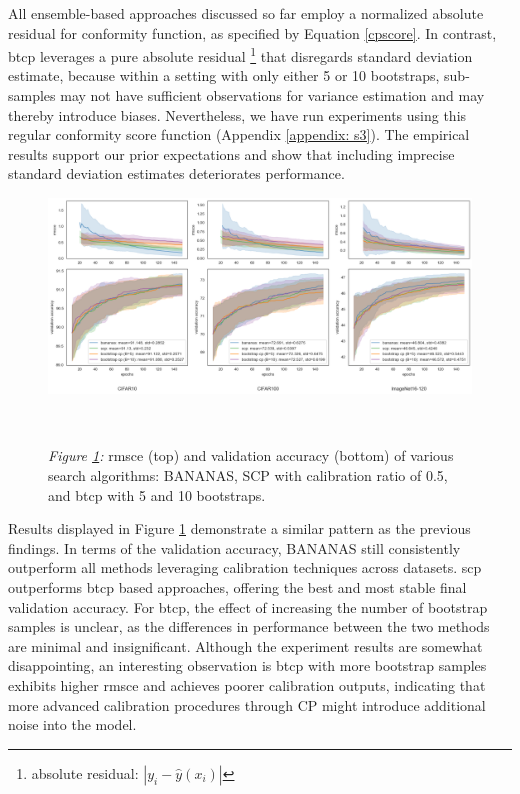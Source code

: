 \documentclass[a4paper,oneside,bibliography=totoc]{scrbook}
\begin{document}
\begin{description}[leftmargin=0cm, listparindent=\parindent]
		All ensemble-based approaches discussed so far employ a normalized absolute residual for conformity function, as specified by Equation \ref{cpscore}. In contrast, \gls{btcp} leverages a pure absolute residual \footnote{absolute residual: $|y_i - \hat{y}(x_i)|$} that disregards standard deviation estimate, because within a setting with only either 5 or 10 bootstraps, sub-samples may not have sufficient observations for variance estimation and may thereby introduce biases. Nevertheless, we have run experiments using this regular conformity score function (Appendix \ref{appendix: s3}). The empirical results support our prior expectations and show that including imprecise standard deviation estimates deteriorates performance.
	
	\vspace{0.3em}
	\begin{figure}[H]
		\centering
		\includegraphics[scale=0.37 ]{figs/bootstrap.png}
		\label{fig: btcp}
		\\
 		\parbox{\linewidth}{
		\vspace{1em}
 	  		{\small \textit{Figure \ref{fig: btcp}:} \gls{rmsce} (top) and validation accuracy (bottom) of various search algorithms: BANANAS, SCP with calibration ratio of 0.5, and \gls{btcp} with 5 and 10 bootstraps.}
 	 	}	
	\end{figure}	 
	
	\vspace{1em}
	Results displayed in Figure \ref{fig: btcp} demonstrate a similar pattern as the previous findings. In terms of the validation accuracy, BANANAS still consistently outperform all methods leveraging calibration techniques across datasets. \gls{scp} outperforms \gls{btcp} based approaches, offering the best and most stable final validation accuracy. For \gls{btcp}, the effect of increasing the number of bootstrap samples is unclear, as the differences in performance between the two methods are minimal and insignificant. Although the experiment results are somewhat disappointing, an interesting observation is \gls{btcp} with more bootstrap samples exhibits higher \gls{rmsce} and achieves poorer calibration outputs, indicating that more advanced calibration procedures through CP might introduce additional noise into the model.
		

\end{description}
\end{document}

